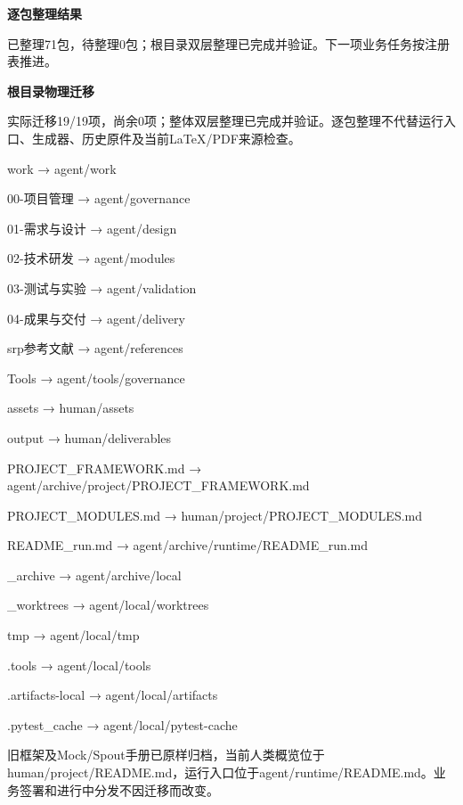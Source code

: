 \documentclass[11pt,a4paper]{article}
\newcommand{\reviewsection}[1]{\par\Needspace{5\baselineskip}\vspace{10pt}\begin{center}{\titlelatin\titlecjk\bfseries\fontsize{14}{20}\selectfont #1}\end{center}}
\begin{document}
\reviewsection{逐包整理结果}
已整理71包，待整理0包；根目录双层整理已完成并验证。下一项业务任务按注册表推进。


\reviewsection{根目录物理迁移}
实际迁移19/\allowbreak{}19项，尚余0项；整体双层整理已完成并验证。逐包整理不代替运行入口、生成器、历史原件及当前LaTeX/\allowbreak{}PDF来源检查。


work → agent/\allowbreak{}work


00-\allowbreak{}项目管理 → agent/\allowbreak{}governance


01-\allowbreak{}需求与设计 → agent/\allowbreak{}design


02-\allowbreak{}技术研发 → agent/\allowbreak{}modules


03-\allowbreak{}测试与实验 → agent/\allowbreak{}validation


04-\allowbreak{}成果与交付 → agent/\allowbreak{}delivery


srp参考文献 → agent/\allowbreak{}references


Tools → agent/\allowbreak{}tools/\allowbreak{}governance


assets → human/\allowbreak{}assets


output → human/\allowbreak{}deliverables


PROJECT\_\allowbreak{}FRAMEWORK.md → agent/\allowbreak{}archive/\allowbreak{}project/\allowbreak{}PROJECT\_\allowbreak{}FRAMEWORK.md


PROJECT\_\allowbreak{}MODULES.md → human/\allowbreak{}project/\allowbreak{}PROJECT\_\allowbreak{}MODULES.md


README\_\allowbreak{}run.md → agent/\allowbreak{}archive/\allowbreak{}runtime/\allowbreak{}README\_\allowbreak{}run.md


\_\allowbreak{}archive → agent/\allowbreak{}archive/\allowbreak{}local


\_\allowbreak{}worktrees → agent/\allowbreak{}local/\allowbreak{}worktrees


tmp → agent/\allowbreak{}local/\allowbreak{}tmp


.tools → agent/\allowbreak{}local/\allowbreak{}tools


.artifacts-\allowbreak{}local → agent/\allowbreak{}local/\allowbreak{}artifacts


.pytest\_\allowbreak{}cache → agent/\allowbreak{}local/\allowbreak{}pytest-\allowbreak{}cache


旧框架及Mock/\allowbreak{}Spout手册已原样归档，当前人类概览位于human/\allowbreak{}project/\allowbreak{}README.md，运行入口位于agent/\allowbreak{}runtime/\allowbreak{}README.md。业务签署和进行中分发不因迁移而改变。
\end{document}
